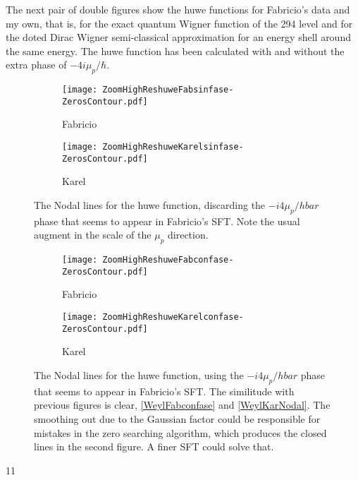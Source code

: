 \documentclass[a4paper,12pt]{article}
\begin{document}
The next pair of double figures show the huwe functions for Fabricio's data and my own, 
that is, for the exact quantum Wigner function of the 294 level and for the
doted Dirac Wigner semi-classical approximation for an energy shell around the same energy. 
The huwe function has been calculated with and without the extra phase of $-4i\mu_p /\hbar$.



\begin{figure}[H]
  \centering
  \begin{subfigure}[b]{0.45\textwidth}
    \centering
          \texttt{[image: ZoomHighReshuweFabsinfase-ZerosContour.pdf]}
          \caption{Fabricio}
                \label{huweFabsinfase}
  \end{subfigure}%
\begin{subfigure}[b]{0.45\textwidth}
    \centering
          \texttt{[image: ZoomHighReshuweKarelsinfase-ZerosContour.pdf]}
                \caption{Karel}
                \label{huweKarelsinfase}
  \end{subfigure}%
\caption{The Nodal lines for the huwe function, discarding the $-i4\mu_p/hbar$ phase that
seems to appear in Fabricio's SFT. Note the usual augment in the scale of the $\mu_p$ direction.  }
\label{huwesinfase}
\end{figure}



\begin{figure}[H]
  \centering
  \begin{subfigure}[b]{0.45\textwidth}
    \centering
          \texttt{[image: ZoomHighReshuweFabconfase-ZerosContour.pdf]}
          \caption{Fabricio}
                \label{huweFabconfase}
  \end{subfigure}%
\begin{subfigure}[b]{0.45\textwidth}
    \centering
          \texttt{[image: ZoomHighReshuweKarelconfase-ZerosContour.pdf]}
                \caption{Karel}
                \label{huweKarelconfase}
  \end{subfigure}%
\caption{The Nodal lines for the huwe function, using the $-i4\mu_p/hbar$ phase that
seems to appear in Fabricio's SFT. The similitude with previous figures is clear, \ref{WeylFabconfase} and
\ref{WeylKarNodal}.  The smoothing out due to the Gaussian factor could be responsible for mistakes
in the zero searching algorithm, which produces the closed lines in the second figure. A finer SFT could
solve that.}
\label{huweconfase}
\end{figure}11
\end{document}
